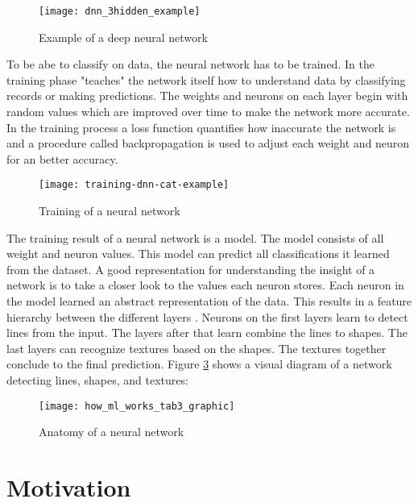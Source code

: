 \begin{figure}[H]
    \centering
    \texttt{[image: dnn\_3hidden\_example]}
    \caption{\cite{dnn_3hidden_example_image} Example of a deep neural network}
    \label{fig:dnn_3hidden_example}
\end{figure}

To be abe to classify on data, the neural network has to be trained.
In the training phase "teaches" the network itself how to understand data by classifying records or making predictions. \cite{ibm-watson-healthcare}
The weights and neurons on each layer begin with random values which are improved over time to make the network more accurate.
In the training process a loss function quantifies how inaccurate the network is and a procedure called backpropagation is used to adjust each weight and neuron for an better accuracy.
\cite{nvidia-ai-explained, tensorflow-about}

\begin{figure}[H]
    \centering
    \texttt{[image: training-dnn-cat-example]}
    \caption{\cite{tf_dnn_training_cat_example} Training of a neural network}
    \label{fig:tf_dnn_training_cat_example}
\end{figure}

The training result of a neural network is a model.
The model consists of all weight and neuron values.
\hfill \break
This model can predict all classifications it learned from the dataset.
A good representation for understanding the insight of a network is to take a closer look to the values each neuron stores.
Each neuron in the model learned an abstract representation of the data.
This results in a feature hierarchy between the different layers \cite{skymind_neural_network}.
Neurons on the first layers learn to detect lines from the input.
The layers after that learn combine the lines to shapes.
The last layers can recognize textures based on the shapes.
The textures together conclude to the final prediction.
Figure \ref{fig:tf_dnn_shapes_textures} shows a visual diagram of a network detecting lines, shapes, and textures:
\cite{nvidia-ai-explained, tensorflow-about}

\begin{figure}[H]
    \centering
    \texttt{[image: how\_ml\_works\_tab3\_graphic]}
    \caption{\cite{tf_dnn_shapes_textures} Anatomy of a neural network}
    \label{fig:tf_dnn_shapes_textures}
\end{figure}

\section{Motivation}
\label{intro_motivation}

